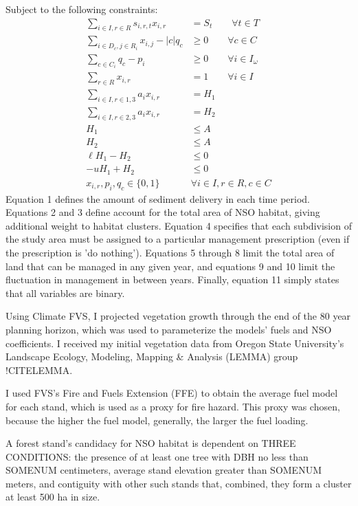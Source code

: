 Subject to the following constraints:
\begin{align}
\sum_{i\in I,r\in R} s_{i,r,t} x_{i,r} &= S_t \qquad \forall t \in T \\
\sum_{i \in D_c, j \in R_i} x_{i,j} - |c| q_c &\ge 0 \qquad \forall c \in C \\
\sum_{c \in C_i} q_c - p_i &\ge 0 \qquad \forall i \in I_\omega \\
\sum_{r \in R} x_{i,r} &= 1  \qquad \forall i \in I \\
\sum_{i \in I,r \in 1,3} a_i x_{i,r} &= H_1 \\
\sum_{i \in I,r \in 2,3} a_i x_{i,r} &= H_2 \\
H_1 &\le A \\
H_2 &\le A \\
\ell H_1 - H_2 &\le 0 \\
-u H_1 + H_2 &\le 0 \\
x_{i,r}, p_i, q_c \in \{0,1\} \quad &\forall i \in I, r \in R, c \in C
\end{align}													
Equation 1 defines the amount of sediment delivery in each time period. Equations 2 and 3 define account for the total area of NSO habitat, giving additional weight to habitat clusters. Equation 4 specifies that each subdivision of the study area must be assigned to a particular management prescription (even if the prescription is 'do nothing'). Equations 5 through 8 limit the total area of land that can be managed in any given year, and equations 9 and 10 limit the fluctuation in management in between years. Finally, equation 11 simply states that all variables are binary.

Using Climate FVS, I projected vegetation growth through the end of the 80 year planning horizon, which was used to parameterize the models' fuels and NSO coefficients. I received my initial vegetation data from Oregon State University's Landscape Ecology, Modeling, Mapping \& Analysis (LEMMA) group !CITELEMMA.

I used FVS's Fire and Fuels Extension (FFE) to obtain the average fuel model for each stand, which is used as a proxy for fire hazard. This proxy was chosen, because the higher the fuel model, generally, the larger the fuel loading. 

A forest stand's candidacy for NSO habitat is dependent on THREE CONDITIONS: the presence of at least one tree with DBH no less than SOMENUM centimeters, average stand elevation greater than SOMENUM meters, and contiguity with other such stands that, combined, they form a cluster at least 500 ha in size.


